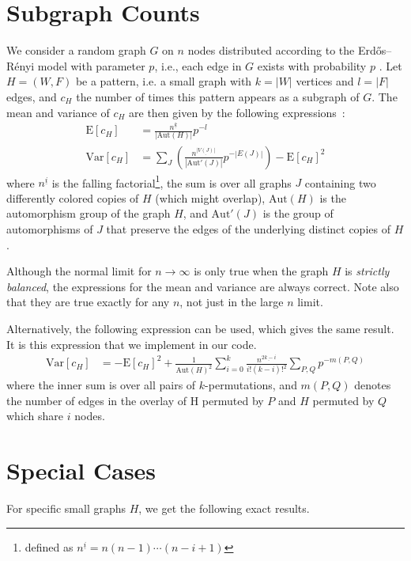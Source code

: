 \documentclass{article}
\begin{document}
\section{Subgraph Counts}
We consider a random graph $G$ on $n$ nodes distributed according to the
Erdős--Rényi model with parameter $p$, i.e., each edge in $G$ exists with
probability $p$ \cite{b569}. Let $H=(W,F)$ be a pattern, i.e. a small graph with
$k=|W|$ vertices and $l=|F|$ edges, and $c_H$ the number of times this pattern
appears as a subgraph of $G$.  
The mean and variance of $c_H$ are then given by the following
expressions~\cite{gp6}:
\begin{align*}
  \mathrm{E}[c_H] &= \frac{n^{\underline{k}}}{|\mathrm{Aut}(H)|} p^{-l} \\
  \mathrm{Var}[c_H] &=
  \sum_J\left(
    \frac{n^{\underline{|V(J)|}}}{|\mathrm{Aut'}(J)|} p^{-|E(J)|} \right)
   - \mathrm{E}[c_H]^2
\end{align*}
where $n^{\underline{i}}$ is the falling factorial\footnote{defined
  as $n^{\underline{i}} = n (n-1) \cdots (n-i+1)$}, 
the sum is over all 
graphs $J$ containing two differently colored copies of $H$ (which might
overlap), 
$\mathrm{Aut}(H)$ is the automorphism group of the graph $H$, 
and $\mathrm{Aut'}(J)$ is the group of automorphisms of $J$ that preserve
the edges of the underlying distinct copies of $H$. 

Although the normal limit for $n \rightarrow \infty$ is only true when the
graph $H$ is \emph{strictly balanced}, the expressions for the mean and
variance are always correct.  Note also that they are true exactly for
any $n$, not just in the large $n$ limit.  

Alternatively, the following expression can be used, which gives the
same result.  It is this expression that we implement in our code.  
\begin{align*}
  \mathrm{Var}[c_H] &=
  - \mathrm{E}[c_H]^2 + \frac{1}{\mathrm{Aut}(H)^2}\sum_{i=0}^k
  \frac{n^{\underline{2k-i}}}{i!(k-i)!^2} 
  \sum_{P,Q} p^{-m(P,Q)}
\end{align*}
where the inner sum is over all pairs of $k$-permutations, and $m(P,Q)$
denotes the number of edges in the overlay of H permuted by $P$ and $H$
permuted by $Q$ which share $i$ nodes.

\section{Special Cases}
For specific small graphs $H$, we get the following exact results. 
\end{document}
